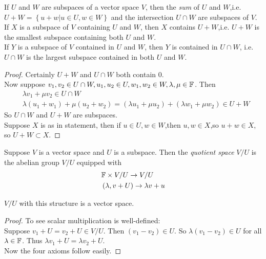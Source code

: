 \documentclass[a4paper]{article}
\begin{document}
\begin{prop}
If $U$ and $W$ are subspaces of a vector space $V$, then the \emph{sum} of $U$ and $W$,i.e. $U+W=\left\{u+w|u\in U, w\in W\right\}$ and the intersection $U\cap W$ are subspaces of $V$.\\
If $X$ is a subspace of $V$ containing $U$ and $W$, then $X$ contains $U+W$,i.e. $U+W$ is the smallest subspace containing both $U$ and $W$.\\
If $Y$ is a subspace of $V$ contained in $U$ and $W$, then $Y$ is contained in $U\cap W$, i.e. $U\cap W$ is the largest subspace contained in both $U$ and $W$.
\begin{proof}
Certainly $U+W$ and $U\cap W$ both contain $0$.\\
Now suppose $v_1,v_2 \in U\cap W, u_1,u_2 \in U, w_1,w_2 \in W, \lambda,\mu \in \mathbb{F}$. Then
\begin{equation*}
\begin{aligned}
&\lambda v_1 + \mu v_2 \in U\cap W\\
&\lambda\left(u_1+w_1\right)+\mu\left(u_2+w_2\right)=\left(\lambda u_1 + \mu u_2\right) + \left(\lambda w_1 + \mu w_2\right) \in U+W
\end{aligned}
\end{equation*}
So $U\cap W$ and $U+W$ are subspaces.\\
Suppose $X$ is as in statement, then if $u\in U, w\in W$,then $u,w\in X$,so $u+w\in X$, so $U+W\subset X$.
\end{proof}
\end{prop}

\begin{defi}
Suppose $V$ is a vector space and $U$ is a subspace. Then the \emph{quotient space} $V/U$ is the abelian group $V/U$ equipped with 
\begin{equation*}
\begin{aligned}
&\mathbb{F} \times V/U \to V/U\\
&\left(\lambda,v+U\right) \to \lambda v + u
\end{aligned}
\end{equation*}
\end{defi}

\begin{prop}
$V/U$ with this structure is a vector space.
\begin{proof}
To see scalar multiplication is well-defined:\\
Suppose $v_1+U = v_2+U \in V/U$. Then $\left(v_1-v_2\right) \in U$. So $\lambda\left(v_1-v_2\right) \in U$ for all $\lambda \in \mathbb{F}$. Thus $\lambda v_1 + U = \lambda v_2+U$.\\
Now the four axioms follow easily.
\end{proof}
\end{prop}
\end{document}
